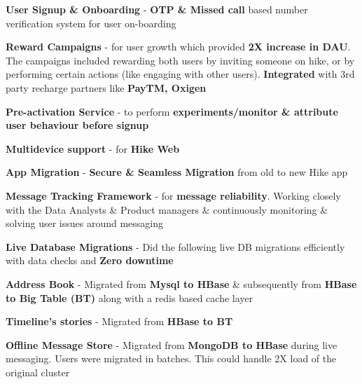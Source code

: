 \begin{cventries}
{\begin{cvitems}
\begin{cventries}
{\begin{cvsubitems}
		        \item {\textbf{User Signup \& Onboarding} - \textbf{OTP \& Missed call} based number verification system for user on-boarding}
		        \item {\textbf{Reward Campaigns} - for user growth which provided \textbf{2X increase in DAU}. The campaigns included rewarding both users by inviting someone on hike, or by performing certain actions (like engaging with other users). \textbf{Integrated} with 3rd party recharge partners like \textbf{PayTM, Oxigen}}
		        \item {\textbf{Pre-activation Service} - to perform \textbf{experiments/monitor \& attribute user behaviour before signup}}
        		\item {\textbf{Multidevice support} - for \textbf{Hike Web}}
        		\item {\textbf{App Migration} - \textbf{Secure \& Seamless Migration} from old to new Hike app}
            	\item {\textbf{Message Tracking Framework} - for \textbf{message reliability}. Working closely with the Data Analysts \& Product managers \& continuously monitoring \& solving user issues around messaging}
              \end{cvsubitems}
            }
        \end{cventries}
		\item {\textbf{Live Database Migrations} - Did the following live DB migrations efficiently with data checks and \textbf{Zero downtime}}
        \begin{cventries}
          \cventry
            {} %
            {} %
            {} %
            {} %
            {
             \vspace{-20pt}
              \begin{cvsubitems}
                \item {\textbf{Address Book} - Migrated from \textbf{Mysql to HBase} \& subsequently from \textbf{HBase to Big Table (BT)} along with a redis based cache layer}
                \item {\textbf{Timeline's stories} - Migrated from \textbf{HBase to BT}}
                \item {\textbf{Offline Message Store} - Migrated from \textbf{MongoDB to HBase} during live messaging. Users were migrated in batches. This could handle 2X load of the original cluster}
              \end{cvsubitems}
            }
        \end{cventries}

\end{cvitems}}
\end{cventries}
